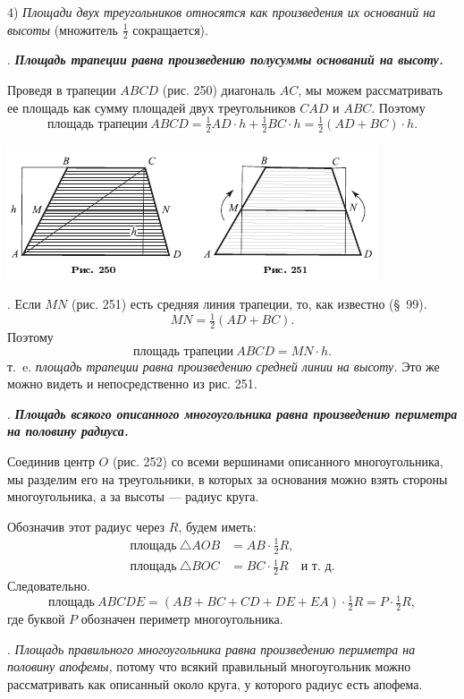 \documentclass[oneside]{book}
\begin{document}
4) \emph{Площади двух треугольников относятся как произведения их оснований на высоты} (множитель $\tfrac12$ сокращается).

.
\textbf{\emph{Площадь трапеции равна произведению полусуммы оснований на высоту.}}

Проведя в трапеции $ABCD$ (рис. 250) диагональ $AC$, мы можем рассматривать ее площадь как сумму площадей двух треугольников $CAD$ и $ABC$.
Поэтому
\[\text{площадь трапеции}~ABCD
=\tfrac12AD\cdot  h+\tfrac12BC\cdot  h= 
\tfrac12(AD+BC) \cdot  h.\]

\includegraphics{pics/ris-250-251}

.
Если $MN$ (рис. 251) есть средняя линия трапеции, то, как известно (§~99).
\[MN = \tfrac12(AD+BC).\]
Поэтому
\[\text{площадь трапеции}~ABCD=MN\cdot  h.\]
т.~e. \emph{площадь трапеции равна произведению средней линии на высоту.}
Это же можно видеть и непосредственно из рис. 251.

.
\textbf{\emph{Площадь всякого описанного многоугольника равна произведению периметра на половину радиуса.}}

Соединив центр $O$ (рис. 252) со всеми вершинами описанного многоугольника, мы разделим его на треугольники, в которых за основания можно взять стороны многоугольника, а за высоты — радиус круга.

Обозначив этот радиус через $R$, будем иметь:
\begin{align*}
\text{площадь}~\triangle AOB&=AB \cdot  \tfrac12R,
\\
\text{площадь}~\triangle BOC &= BC \cdot  \tfrac12R\quad\text{и~т.~д.}
\end{align*}
Следовательно.
\[\text{площадь}~ABCDE = (AB+BC+CD+DE+EA) \cdot  \tfrac12R= P \cdot \tfrac12R,\]
где буквой $P$ обозначен периметр многоугольника.

.
\emph{Площадь правильного многоугольника равна произведению периметра на половину апофемы,} потому что всякий правильный многоугольник можно рассматривать как описанный около круга, у которого радиус есть апофема.
\end{document}
